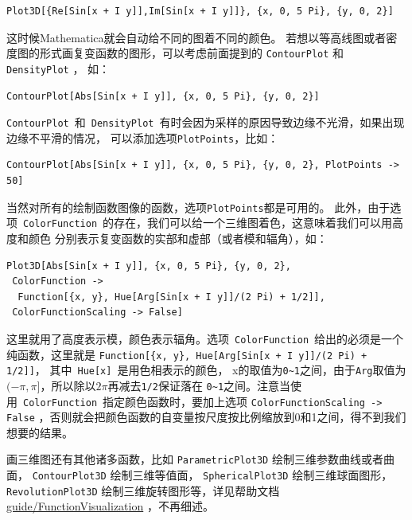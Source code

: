 \documentclass[UTF8,a4paper,10pt]{ctexart}
\begin{document}
\begin{lstlisting}
Plot3D[{Re[Sin[x + I y]],Im[Sin[x + I y]]}, {x, 0, 5 Pi}, {y, 0, 2}]
\end{lstlisting}
这时候Mathematica就会自动给不同的图着不同的颜色。
若想以等高线图或者密度图的形式画复变函数的图形，可以考虑前面提到的 \verb|ContourPlot| 和 \verb|DensityPlot| ，
如：

\begin{lstlisting}
ContourPlot[Abs[Sin[x + I y]], {x, 0, 5 Pi}, {y, 0, 2}]
\end{lstlisting}
\verb|ContourPlot|~和~\verb|DensityPlot|~有时会因为采样的原因导致边缘不光滑，如果出现边缘不平滑的情况，
可以添加选项\verb|PlotPoints|，比如：

\begin{lstlisting}
ContourPlot[Abs[Sin[x + I y]], {x, 0, 5 Pi}, {y, 0, 2}, PlotPoints -> 50]
\end{lstlisting}
当然对所有的绘制函数图像的函数，选项\verb|PlotPoints|都是可用的。
此外，由于选项~\verb|ColorFunction|~的存在，我们可以给一个三维图着色，这意味着我们可以用高度和颜色
分别表示复变函数的实部和虚部（或者模和辐角），如：

\begin{lstlisting}
Plot3D[Abs[Sin[x + I y]], {x, 0, 5 Pi}, {y, 0, 2}, 
 ColorFunction -> 
  Function[{x, y}, Hue[Arg[Sin[x + I y]]/(2 Pi) + 1/2]], 
 ColorFunctionScaling -> False]
\end{lstlisting}
这里就用了高度表示模，颜色表示辐角。选项~\verb|ColorFunction|~给出的必须是一个纯函数，这里就是
\lstinline|Function[{x, y}, Hue[Arg[Sin[x + I y]]/(2 Pi) + 1/2]]|，
其中~\verb|Hue[x]|~是用色相表示的颜色，
x的取值为\verb|0~1|之间，由于\verb|Arg|取值为$(-\pi,\pi]$，所以除以$2\pi$再减去\verb|1/2|保证落在
\verb|0~1|之间。注意当使用~\verb|ColorFunction|~指定颜色函数时，要加上选项 \verb|ColorFunctionScaling -> False|
，否则就会把颜色函数的自变量按尺度按比例缩放到0和1之间，得不到我们想要的结果。

画三维图还有其他诸多函数，比如 \verb|ParametricPlot3D| 绘制三维参数曲线或者曲面， \verb|ContourPlot3D|  绘制三维等值面， \verb|SphericalPlot3D| 绘制三维球面图形，
 \verb|RevolutionPlot3D| 绘制三维旋转图形等，详见帮助文档
 \href{http://reference.wolfram.com/language/guide/FunctionVisualization.html}{guide/FunctionVisualization}
 ，不再细述。
\end{document}
